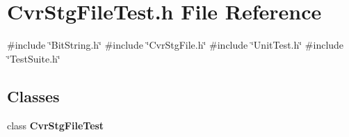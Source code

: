 \section{Cvr\+Stg\+File\+Test.\+h File Reference}
\label{CvrStgFileTest_8h}
{\ttfamily \#include \char`\"{}Bit\+String.\+h\char`\"{}}\newline
{\ttfamily \#include \char`\"{}Cvr\+Stg\+File.\+h\char`\"{}}\newline
{\ttfamily \#include \char`\"{}Unit\+Test.\+h\char`\"{}}\newline
{\ttfamily \#include \char`\"{}Test\+Suite.\+h\char`\"{}}\newline
\subsection*{Classes}
\begin{DoxyCompactItemize}
\item 
class \textbf{ Cvr\+Stg\+File\+Test}
\end{DoxyCompactItemize}
